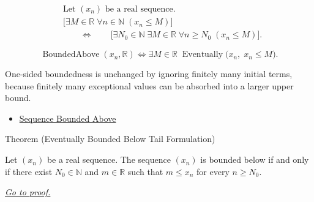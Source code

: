 \begin{remark*}
\[
\begin{aligned}
&\text{Let } (x_n) \text{ be a real sequence.}\\
&\bigl[
\exists M \in \mathbb{R}\;
\forall n \in \mathbb{N}\;(x_n \le M)
\bigr]\\
&\qquad\Longleftrightarrow\qquad
\bigl[
\exists N_0 \in \mathbb{N}\;
\exists M \in \mathbb{R}\;
\forall n \ge N_0\;(x_n \le M)
\bigr].
\end{aligned}
\]
\end{remark*}

\begin{remark*}
\[
\operatorname{BoundedAbove}(x_n,\mathbb{R})
\Longleftrightarrow
\exists M \in \mathbb{R}\;
\operatorname{Eventually}\bigl(x_n,\; x_n \le M\bigr).
\]
\end{remark*}

\begin{remark*}[Interpretation]
One-sided boundedness is unchanged by ignoring finitely many initial terms,
because finitely many exceptional values can be absorbed into a larger upper
bound.
\end{remark*}

\begin{dependencies}
\begin{itemize}
  \item \hyperref[def:sequence-bounded-above]{Sequence Bounded Above}
\end{itemize}
\end{dependencies}


\begin{theorembox}{Theorem (Eventually Bounded Below Tail Formulation)}
\begin{theorem}
\label{thm:eventually-bounded-below-tail-formulation}
Let $(x_n)$ be a real sequence. The sequence $(x_n)$ is bounded below if and
only if there exist $N_0 \in \mathbb{N}$ and $m \in \mathbb{R}$ such that
$m \le x_n$ for every $n \ge N_0$.

\smallskip
\noindent
\hyperref[prf:eventually-bounded-below-tail-formulation]{\textit{Go to proof.}}
\end{theorem}
\end{theorembox}

